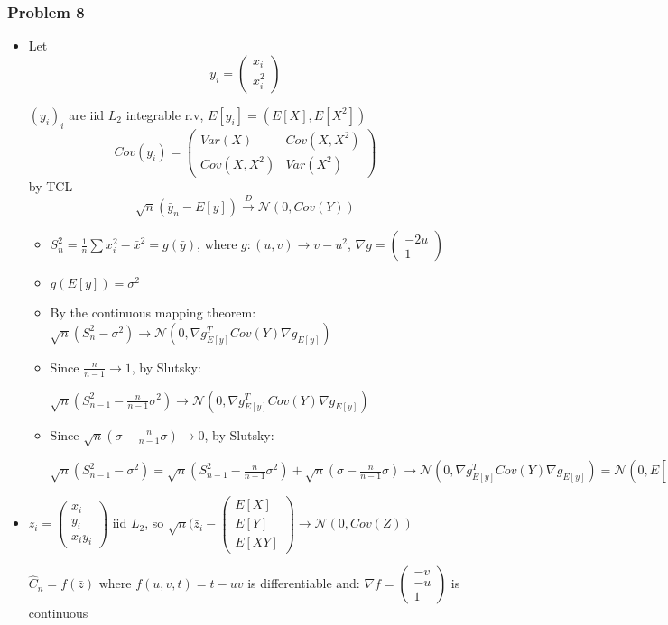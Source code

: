 \documentclass[12pt]{article}
\newcommand{\Q}[1]{\subsubsection*{Problem #1}}
\newcommand{\icol}[1]{%
  \left(\begin{smallmatrix}#1\end{smallmatrix}\right)%
}
\begin{document}
\Q{8}
\begin{itemize}
\item Let \[y_i = \left( \begin{array}{c} x_i\\x_i^2\end{array} \right)\]


  $(y_i)_i$ are iid $L_2$ integrable r.v,
  $E[y_i] = (E[X], E[X^2])$
  \[ Cov(y_i) = \left( \begin{array}{cc} Var(X) & Cov(X, X^2)\\Cov(X,X^2) & Var(X^2)  \end{array}\right) \]
  by TCL $$\sqrt n (\bar y_n - E[y]) \overset{D}{\rightarrow} \mathcal N(0, Cov(Y))$$
  \begin{itemize}
  \item 
    $S_{n}^2 = \frac1n \sum x_i^2 - {\bar x}^2 = g(\bar y)$, where $g: (u, v) \rightarrow v - u^2$, $\nabla g = \icol{-2u\\1}$
  \item 
  $g(E[y]) = \sigma^2$
\end{itemize}  
\begin{itemize}
\item By the continuous mapping theorem:
  $ \sqrt n (S_n^2 - \sigma^2) \rightarrow \mathcal N (0, \nabla
  g_{E[y]}^T Cov(Y) \nabla g_{E[y]})$

\item Since $\frac n{n-1} \rightarrow 1$, by Slutsky:

  $ \sqrt n (S_{n-1}^2 - \frac n{n-1}\sigma^2) \rightarrow \mathcal N
  (0, \nabla g_{E[y]}^T Cov(Y) \nabla g_{E[y]})$

\item Since $\sqrt n (\sigma - \frac n{n-1}\sigma ) \rightarrow 0$, by Slutsky:

  $ \sqrt n (S_{n-1}^2 - \sigma^2) = \sqrt n (S_{n-1}^2 - \frac
  n{n-1}\sigma^2) + \sqrt n (\sigma - \frac n{n-1}\sigma ) \rightarrow
  \mathcal N (0, \nabla g_{E[y]}^T Cov(Y) \nabla g_{E[y]}) = \mathcal N
  (0, E[(X_1 - EX_1)^4] - \sigma^4)$
\end{itemize}

\item
  $z_i = \icol { x_i\\ y_i\\ x_iy_i}$ iid $L_2$, so $\sqrt{n}(\bar z_i - \icol { E[X]\\ E[Y] \\ E[XY]} \rightarrow \mathcal N(0, Cov(Z))$
  
  $\hat C_n = f(\bar z)$ where $f(u, v, t) = t - uv$ is differentiable and:
  $\nabla f = \icol{ -v\\ -u \\1 }$ is continuous


\end{itemize}
\end{document}
